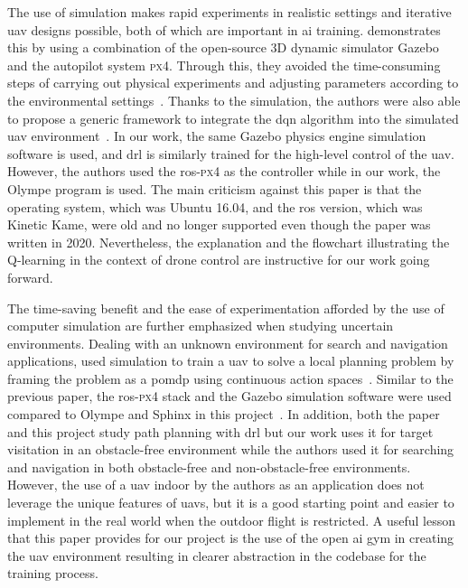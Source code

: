 \documentclass[../main.tex]{subfiles}
\begin{document}
The use of simulation makes rapid experiments in realistic settings 
and iterative \gls{uav} designs possible, 
both of which are important in \gls{ai} training. 
\citeauthor{Zho20} demonstrates this by %
using a combination of the open-source 3D dynamic simulator Gazebo
and the autopilot system \textsc{px4}.
Through this, they avoided the time-consuming steps of 
carrying out physical experiments
and adjusting parameters according 
to the environmental settings~\cite{Zho20}.
Thanks to the simulation, 
the authors were also able to propose a generic
framework to integrate the \gls{dqn} algorithm into 
the simulated \gls{uav} environment~\cite{Zho20}.
In our work, the same Gazebo physics engine
simulation software is used, and \gls{drl} is similarly trained
for the high-level control of the \gls{uav}. 
However, the authors used the \gls{ros}-\textsc{px4} as the controller 
while in our work, the Olympe program is used.
The main criticism against this paper is that the operating system,
which was Ubuntu 16.04, and 
the \gls{ros} version, which was Kinetic Kame, 
were old and no longer supported 
even though the paper was written in 2020.
Nevertheless, the explanation and the flowchart illustrating the 
Q-learning in the context of drone control are instructive 
for our work going forward.

The time-saving benefit and the ease of experimentation 
afforded by the use of computer simulation are further emphasized 
when studying uncertain environments.
Dealing with an unknown environment for search and navigation applications,
\citeauthor{Wal19} used simulation to train a \gls{uav}
to solve a local planning problem
by framing the problem as 
a \gls{pomdp}
using continuous action spaces~\cite{Wal19}.
Similar to the previous paper, the \gls{ros}-\textsc{px4} stack 
and the Gazebo 
simulation software were used compared to Olympe and Sphinx 
in this project~\cite{Wal19}.
In addition, both the paper and this project study path planning 
with \gls{drl} but our work uses it for target visitation 
in an obstacle-free environment 
while the authors used it for searching and navigation
in both obstacle-free and non-obstacle-free environments.
However, the use of a \gls{uav} indoor by the authors as an application 
does not leverage the unique features of \glspl{uav}, 
but it is a good starting point 
and easier to implement in the real world 
when the outdoor flight is restricted.
A useful lesson that this paper provides for our project
is the use of the open \gls{ai} gym in creating the \gls{uav} environment
resulting in clearer abstraction in the codebase
for the training process.
\end{document}
